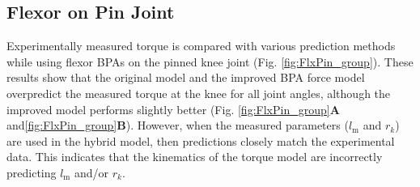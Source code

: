 \subsection{Flexor on Pin Joint}

Experimentally measured torque is compared with various prediction methods while using flexor BPAs on the pinned knee joint (Fig. \ref{fig:FlxPin_group}). These results show that the original model and the improved BPA force model overpredict the measured torque at the knee for all joint angles, although the improved model performs slightly better (Fig. \ref{fig:FlxPin_group}\textbf{A} and\ref{fig:FlxPin_group}\textbf{B}). However, when the measured parameters ($l_\text{m}$ and $r_{k}$) are used in the hybrid model, then predictions closely match the experimental data. This indicates that the kinematics of the torque model are incorrectly predicting $l_\text{m}$ and/or $r_{k}$. 


